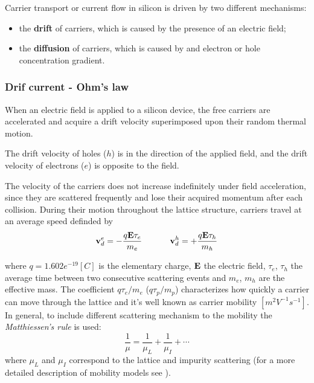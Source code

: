 Carrier transport or current flow in silicon is driven by two different mechanisms:
\begin{itemize}
\item the \textbf{drift} of carriers, which is caused by the presence of an electric field;
\item the \textbf{diffusion} of carriers, which is caused by and electron or hole concentration gradient.
\end{itemize}

\subsubsection{Drif current - Ohm's law}

When an electric field is applied to a silicon device, the free carriers are accelerated and acquire a drift velocity superimposed upon their random thermal motion.

\begin{Osservazione}
The drift velocity of holes ($h$) is in the direction of the applied field, and the drift velocity of electrons ($e$) is opposite to the field.
\end{Osservazione}

The velocity of the carriers does not increase indefinitely under field acceleration, since they are scattered frequently and lose their acquired momentum after each collision.
During their motion throughout the lattice structure, carriers travel at an average speed definded by
\begin{equation}
\label{eq: velocities}
\vect{v}_d^e = - \dfrac{q\vect{E}\tau_e}{m_e}  \psp{20} 
\vect{v}_d^h = + \dfrac{q\vect{E}\tau_h}{m_h}
\end{equation}

where $q=1.602e^{-19}[C]$ is the elementary charge, $\mathbf{E}$ the electric field, $\tau_e$, $\tau_h$ the average time between two consecutive scattering events and $m_e$, $m_h$ are the effective mass.
The coefficient $q\tau_e / m_e$ ($q\tau_p / m_p$) characterizes how quickly a carrier can move through the lattice and it's well known as carrier mobility $[m^2V^{-1}s^{-1}]$.
In general, to include different scattering mechanism to the mobility the \textit{Matthiessen's rule} is used:
\begin{equation}
\dfrac{1}{\mu} = \dfrac{1}{\mu_L} + \dfrac{1}{\mu_I} + \cdots
\end{equation}
where $\mu_L$ and $\mu_I$ correspond to the lattice and impurity scattering (for a more detailed description of mobility models see \cite{ModernVLSIdevices}). 

